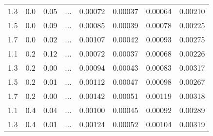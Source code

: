 \begin{table*}[tb]
\begin{center}
\begin{tabular}{rrrrrrrr}
1.3 & 0.0 & 0.05 & ... & 0.00072 & 0.00037 & 0.00064 & 0.00210 \\ 
1.5 & 0.0 & 0.09 & ... & 0.00085 & 0.00039 & 0.00078 & 0.00225 \\ 
1.7 & 0.0 & 0.02 & ... & 0.00107 & 0.00042 & 0.00093 & 0.00275 \\ 
1.1 & 0.2 & 0.12 & ... & 0.00072 & 0.00037 & 0.00068 & 0.00226 \\ 
1.3 & 0.2 & 0.00 & ... & 0.00094 & 0.00043 & 0.00083 & 0.00317 \\ 
1.5 & 0.2 & 0.01 & ... & 0.00112 & 0.00047 & 0.00098 & 0.00267 \\ 
1.7 & 0.2 & 0.00 & ... & 0.00142 & 0.00051 & 0.00119 & 0.00318 \\ 
1.1 & 0.4 & 0.04 & ... & 0.00100 & 0.00045 & 0.00092 & 0.00289 \\ 
1.3 & 0.4 & 0.01 & ... & 0.00124 & 0.00052 & 0.00104 & 0.00319 \\ 
 \hline
\end{tabular}
\label{tab:obsdata}
\end{center}
\end{table*}
